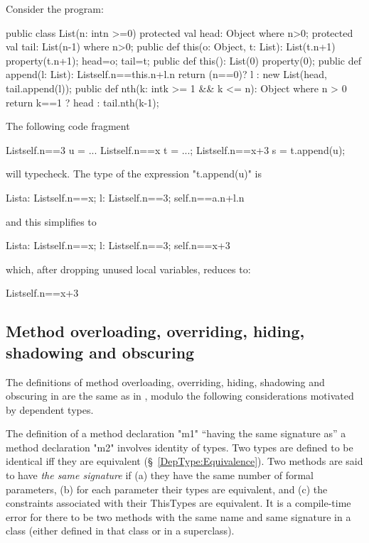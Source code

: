 \begin{example}
Consider the program:
\begin{xten}
public class List(n: int{n >=0}) {
  protected val head: Object where n>0;
  protected val tail: List(n-1) where n>0;
  public def this(o: Object, t: List): List(t.n+1) {
     property(t.n+1);
     head=o;
     tail=t;
  }
  public def this(): List(0) {
     property(0);
  }
  public def append(l: List): List{self.n==this.n+l.n} {
      return (n==0)? l
         : new List(head, tail.append(l)); 
  }
  public def nth(k: int{k >= 1 && k <= n}): Object
    where n > 0 {
      return k==1 ? head : tail.nth(k-1);
  }
}
\end{xten}

The following code fragment
\begin{xten}
List{self.n==3} u = ...
List{self.n==x} t = ...;
List{self.n==x+3} s = t.append(u);
\end{xten}
\noindent will typecheck. The type of the expression \xcd"t.append(u)" is 
\begin{xten}
List{a: List{self.n==x}; 
     l: List{self.n==3}; self.n==a.n+l.n}  
\end{xten}
\noindent and this simplifies to
\begin{xten}
List{a: List{self.n==x}; 
     l: List{self.n==3}; self.n==x+3}  
\end{xten}
\noindent which, after dropping unused local variables, reduces to:
\begin{xten}
List{self.n==x+3}
\end{xten}
\end{example}

\subsection{Method overloading, overriding, hiding, shadowing and obscuring}

The definitions of method overloading, overriding, hiding, shadowing
and obscuring in \Xten{} are the same as in \Java, modulo the following
considerations motivated by dependent types.

The definition of a method declaration \xcd"m1" ``having the same signature
as'' a method declaration \xcd"m2" involves identity of types. Two \Xten{} types
are defined to be identical iff they are equivalent (\S~\ref{DepType:Equivalence}).
Two methods are said to have {\em the same signature} if (a)
they have the same number of formal parameters, (b) for each parameter
their types are equivalent, and (c) the constraints associated with
their ThisTypes are equivalent. It is a compile-time error for there
to be two methods with the same name and same signature in a class
(either defined in that class or in a superclass).

